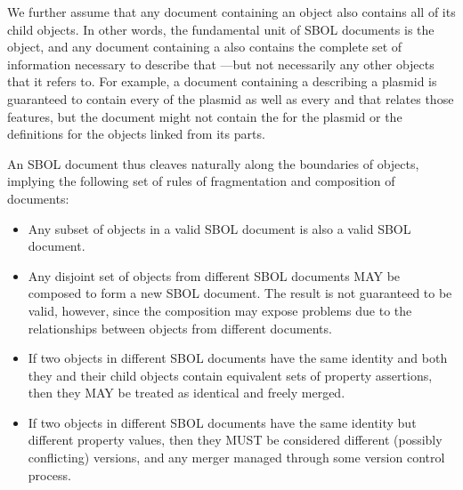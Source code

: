 We further assume that any document containing an object also contains all of its child objects.
In other words, the fundamental unit of SBOL documents is the  object, and any document containing a  also contains the complete set of information necessary to describe that ---but not necessarily any other  objects that it refers to.
For example, a document containing a  describing a plasmid is guaranteed to contain every  of the plasmid as well as every  and  that relates those features, but the document might not contain the  for the plasmid or the definitions for the  objects linked from its  parts.

An SBOL document thus cleaves naturally along the boundaries of  objects, implying the following set of rules of fragmentation and composition of documents:
\begin{itemize}
\item Any subset of  objects in a valid SBOL document is also a valid SBOL document.
\item Any disjoint set of  objects from different SBOL documents MAY be composed to form a new SBOL document. The result is not guaranteed to be valid, however, since the composition may expose problems due to the relationships between  objects from different documents.
\item If two  objects in different SBOL documents have the same identity and both they and their child objects contain equivalent sets of property assertions, then they MAY be treated as identical and freely merged.
\item  If two  objects in different SBOL documents have the same identity but different property values, then they MUST be considered different (possibly conflicting) versions, and any merger managed through some version control process.
\end{itemize}
